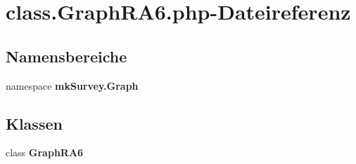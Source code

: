 \section{class.GraphRA6.php-Dateireferenz}
\label{class_8GraphRA6_8php}
\subsection*{Namensbereiche}
\begin{CompactItemize}
\item 
namespace {\bf mkSurvey.Graph}
\end{CompactItemize}
\subsection*{Klassen}
\begin{CompactItemize}
\item 
class {\bf GraphRA6}
\end{CompactItemize}
